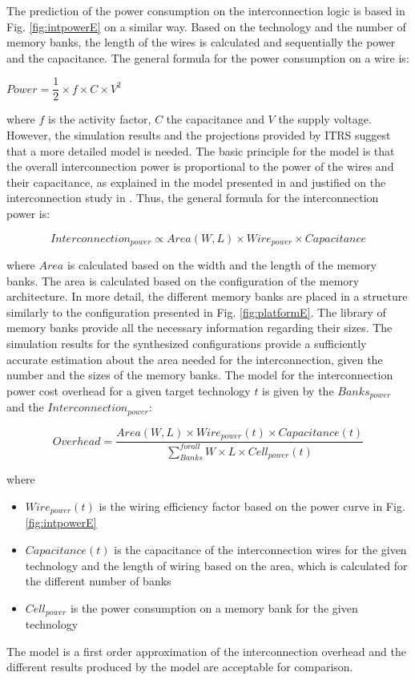   
 The prediction of the power consumption on the interconnection logic is based in Fig. \ref{fig:intpowerE} on a similar way.
 Based on the technology and the number of memory banks, the length of the wires is calculated and sequentially the power and the capacitance.
 The general formula for the power consumption on a wire is:  
 \begin{center}
 $Power = \dfrac{1}{2} \times f \times C \times V^{2} $
 \end{center}
 where  $f$ is the activity factor, $C$ the capacitance and $V$ the supply voltage.
 However, the simulation results and the projections provided by ITRS suggest that a more detailed model is needed. 
 The basic principle for the model is that the overall interconnection power is proportional to the power of the wires and their capacitance, as explained in  the model presented in \cite{wong2000modeling} and justified on the interconnection study in \cite{muralimanohar2007interconnect}.
 Thus, the general formula for the interconnection power is:
 \begin{center}
 $$ Interconnection_{power} \propto Area(W,L) \times Wire_{power} \times Capacitance $$
 \end{center}
 where $Area$ is calculated based on the width and the length of the memory banks.
  The area is calculated based on the configuration of the memory architecture.
  In more detail, the different memory banks are placed in a structure similarly to the configuration presented in Fig. \ref{fig:platformE}.
  The library of memory banks provide all the necessary information regarding their sizes.
  The simulation results for the synthesized configurations provide a sufficiently accurate estimation about the area needed for the interconnection, given the number and the sizes of the memory banks.
 The model for the interconnection power cost overhead for a given target technology $ t $ is given by the $ Banks_{power}$ and the $ Interconnection_{power}$:
 \begin{center}
 $$ Overhead = \dfrac{Area(W,L) \times Wire_{power}(t) \times Capacitance(t)}{\sum_{Banks}^{for all} W \times L \times Cell_{power}(t)} $$ 
  \end{center}
 where 
 \begin{itemize}
 \item $ Wire_{power}(t) $ is the wiring efficiency factor based on the power curve in Fig. \ref{fig:intpowerE}
 \item $Capacitance(t)$ is the capacitance of the interconnection wires for the given technology and the length of wiring based on the area, which is calculated for the different number of banks
 \item $Cell_{power} $ is the power consumption on a memory bank for the given technology
 \end{itemize}
 The model is a first order approximation of the interconnection overhead and the different results produced by the model are acceptable for comparison.
 
